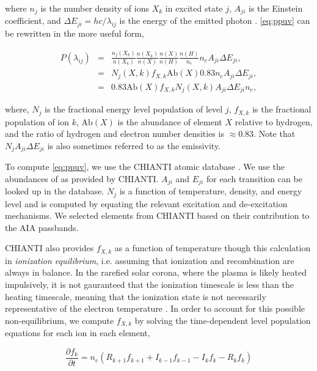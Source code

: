 where $n_j$ is the number density of ions $X_k$ in excited state $j$, $A_{ji}$ is the Einstein coefficient, and $\Delta E_{ji}=hc/\lambda_{ij}$ is the energy of the emitted photon  \citep[see][]{mason_spectroscopic_1994,bradshaw_collisional_2013}. \autoref{eq:ppuv} can be rewritten in the more useful form,

\begin{eqnarray*}
    P(\lambda_{ij}) &=& \frac{n_j(X_k)}{n(X_k)}\frac{n(X_k)}{n(X)}\frac{n(X)}{n(H)}\frac{n(H)}{n_e}n_eA_{ji}\Delta E_{ji}, \\
    &=& N_j(X,k) f_{X,k} \mathrm{Ab}(X) 0.83 n_e A_{ji} \Delta E_{ji}, \\
    &=& 0.83 \mathrm{Ab}(X) f_{X,k} N_j(X,k) A_{ji} \Delta E_{ji} n_e,
\end{eqnarray*}

where, $N_j$ is the fractional energy level population of level $j$, $f_{X,k}$ is the fractional population of ion $k$, $\mathrm{Ab}(X)$ is the abundance of element $X$ relative to hydrogen, and the ratio of hydrogen and electron number densities is $\approx0.83$. Note that $N_j A_{ji} \Delta E_{ji}$ is also sometimes referred to as the emissivity.

To compute \autoref{eq:ppuv}, we use the CHIANTI atomic database \citep{dere_chianti_1997,young_chianti_2016}. We use the abundances of \citet{feldman_potential_1992} as provided by CHIANTI. $A_{ji}$ and $E_{ji}$ for each transition can be looked up in the database. $N_j$ is a function of temperature, density, and energy level and is computed by equating the relevant excitation and de-excitation mechanisms. We selected elements from CHIANTI based on their contribution to the AIA passbands.

CHIANTI also provides $f_{X,k}$ as a function of temperature though this calculation in \textit{ionization equilibrium}, i.e. assuming that ionization and recombination are always in balance. In the rarefied solar corona, where the plasma is likely heated impulsively, it is not gauranteed that the ionization timescale is less than the heating timescale, meaning that the ionization state is not necessarily representative of the electron temperature \citep{bradshaw_explosive_2006,reale_nonequilibrium_2008,bradshaw_numerical_2009}. In order to account for this possible non-equilibrium, we compute $f_{X,k}$ by solving the time-dependent level population equations for each ion in each element,

\begin{equation}\label{eq:nei}
    \frac{\partial f_k}{\partial t} = n_e(R_{k+1}f_{k+1} + I_{k-1}f_{k-1} - I_kf_k - R_kf_k)
\end{equation}

